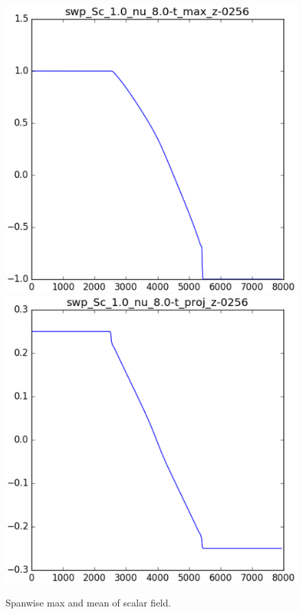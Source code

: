 \begin{figure}
\includegraphics[width=\columnwidth]{figs/swp_Sc_1.0_nu_8.0-t_max_z-0256.eps}
\includegraphics[width=\columnwidth]{figs/swp_Sc_1.0_nu_8.0-t_proj_z-0256.eps}
\caption{
  Spanwise max and mean of scalar field.
}
\end{figure}

